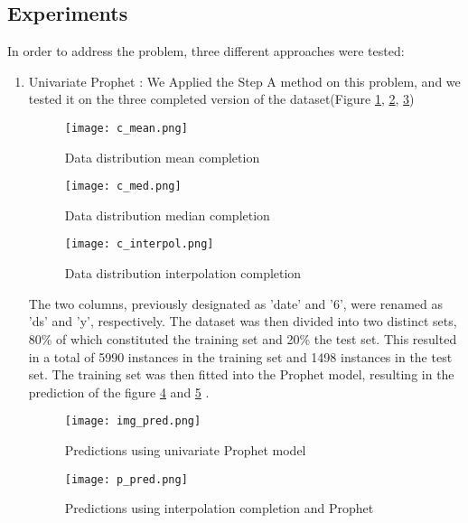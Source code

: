 \documentclass[10pt]{article}
\begin{document}
\begin{multicols}{2}
\subsection{Experiments}

In order to address the problem, three different approaches were tested:
\begin{enumerate}
    \item Univariate Prophet : We Applied the Step A method on this problem, and we tested it on the three completed version of the dataset(Figure \ref{f10}, \ref{f11}, \ref{f12})
\begin{figure}[H]
\centering
\texttt{[image: c\_mean.png]}
\caption{Data distribution mean completion}
\label{f10}
\end{figure}


\begin{figure}[H]
\centering
\texttt{[image: c\_med.png]}
\caption{Data distribution median completion}
\label{f11}
\end{figure}


\begin{figure}[H]
\centering
\texttt{[image: c\_interpol.png]}
\caption{Data distribution interpolation completion}
\label{f12}
\end{figure}

The two columns, previously designated as 'date' and '6', were renamed as 'ds' and 'y', respectively. The dataset was then divided into two distinct sets, 80\% of which constituted the training set and 20\% the test set. This resulted in a total of 5990 instances in the training set and 1498 instances in the test set. \newline
The training set was then fitted into the Prophet model, resulting in the prediction of the figure \ref{f13} and \ref{f14} .


\begin{figure}[H]
\centering
\texttt{[image: img\_pred.png]}
\caption{Predictions using univariate Prophet model}
\label{f13}
\end{figure}

\begin{figure}[H]
\centering
\texttt{[image: p\_pred.png]}
\caption{Predictions using interpolation completion and Prophet}
\label{f14}
\end{figure}


\end{enumerate}
\end{multicols}
\end{document}
